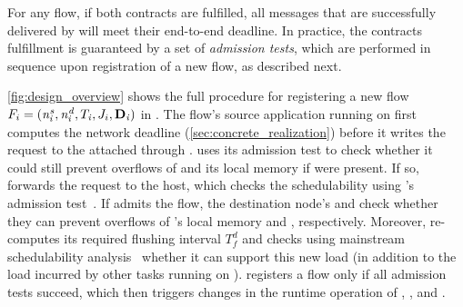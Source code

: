 For any flow, if both contracts are fulfilled, all messages that are successfully delivered by \blink will meet their end-to-end deadline. In practice, the contracts fulfillment is guaranteed by a set of \emph{admission tests}, which are performed in sequence upon registration of a new flow, as described next.


\cref{fig:design_overview} shows the full procedure for registering a new flow $F_{i} = (\mathit{n^s_{i}},\mathit{n^d_{i}},T_{\mathit{i}},J_{i},\mathbf{D}_{\mathit{i}})$ in \DRP.
The flow's source application running on \apsrc first computes the network deadline \ndeadlinei (\cref{sec:concrete_realization}) before it writes the request to the attached \cpsrc through \bolt.
\cpsrc uses its admission test to check whether it could still prevent overflows of \bolt and its local memory if \flowi were present.
If so, \cpsrc forwards the request to the host, which checks the schedulability using \blink's admission test~\cite{zimmerling2017Blink}.
If \blink admits the flow, the destination node's \cpdst and \apdst check whether they can prevent overflows of \cpdst's local memory and \bolt, respectively.
Moreover, \apdst re-computes its required flushing interval $T_f^d$ and checks using mainstream schedulability analysis~\cite{buttazzo2011HardRT} whether it can support this new load (in addition to the load incurred by other tasks running on \apdst).
\DRP registers a flow only if all admission tests succeed, which then triggers changes in the runtime operation of \apsrc, \blink, and \apdst.

